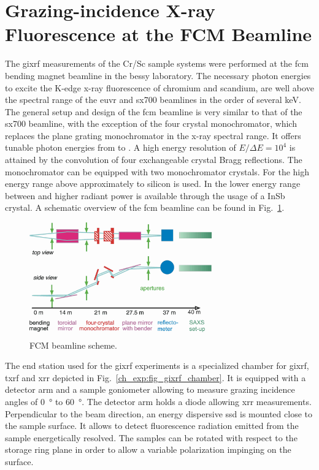 \section{Grazing-incidence X-ray Fluorescence at the FCM Beamline}
The \gls{gixrf} measurements of the Cr/Sc sample systems were performed at the \gls{fcm} bending magnet beamline \cite{krumrey_design_1998} in the \gls{bessy} laboratory. The necessary photon energies to excite the K-edge x-ray fluorescence of chromium and scandium, are well above the spectral range of the \gls{euvr} and \gls{sx700} beamlines in the order of several \si{\kilo\electronvolt}. The general setup and design of the \gls{fcm} beamline is very similar to that of the \gls{sx700} beamline, with the exception of the four crystal monochromator, which replaces the plane grating monochromator in the x-ray spectral range. It offers tunable photon energies from  to . A high energy resolution of $E/\Delta E = 10^4$ is attained by the convolution of four exchangeable crystal Bragg reflections. The monochromator can be equipped with two monochromator crystals. For the high energy range above approximately  to  silicon is used. In the lower energy range between  and  higher radiant power is available through the usage of a InSb crystal. A schematic overview of the \gls{fcm} beamline can be found in Fig.~\ref{ch_exp:fig_fcm_scheme}.
\begin{figure}[htb]
        \includegraphics[width=0.7\textwidth]{img/FCMScheme.png}
        \caption[FCM beamline scheme.]{%
            FCM beamline scheme.}
        \label{ch_exp:fig_fcm_scheme}
\end{figure}

The end station used for the \gls{gixrf} experiments is a specialized chamber for \gls{gixrf}, \gls{txrf} and \gls{xrr} \cite{lubeck_novel_2013} depicted in Fig.~\ref{ch_exp:fig_gixrf_chamber}. It is equipped with a detector arm and a sample goniometer allowing to measure grazing incidence angles of \SI{0}{\degree} to \SI{60}{\degree}. The detector arm holds a diode allowing \gls{xrr} measurements. Perpendicular to the beam direction, an energy dispersive \gls{ssd} is mounted close to the sample surface. It allows to detect fluorescence radiation emitted from the sample energetically resolved. The samples can be rotated with respect to the storage ring plane in order to allow a variable polarization impinging on the surface.




